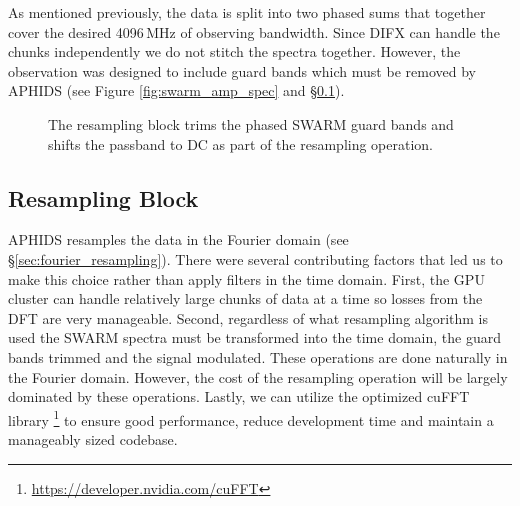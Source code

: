 As mentioned previously, the data is split into two phased sums that together cover the desired 4096\,MHz of 
observing bandwidth.  Since DIFX can handle the chunks independently we do not stitch the spectra together. 
However, the observation was designed to include guard bands which must be removed by APHIDS 
(see Figure \ref{fig:swarm_amp_spec} and \S\ref{sec:resamp_block}).

\begin{figure}[t!]
\linespread{1.}\selectfont{}
\centering
{}
\caption{The resampling block trims the phased SWARM guard bands and shifts the passband to DC as part of the 
resampling operation.}
\label{fig:resampling_block}
\end{figure}


\subsection{Resampling Block}\label{sec:resamp_block}

APHIDS resamples the data in the Fourier domain (see \S \ref{sec:fourier_resampling}).  There were several 
contributing factors that led us to make
this choice rather than apply filters in the time domain.  First, the GPU cluster can handle relatively large 
chunks of data at a time so losses from the DFT are very manageable.  Second, regardless of 
what resampling algorithm is used the SWARM spectra must 
be transformed into the time domain, the guard bands trimmed and the signal modulated.  These operations are done 
naturally in the Fourier domain.  However, the cost of the resampling operation will be largely dominated by 
these operations.  Lastly, we can utilize the optimized cuFFT library
\footnote{\url{https://developer.nvidia.com/cuFFT}} to ensure good performance, reduce development time and 
maintain a manageably sized codebase.

